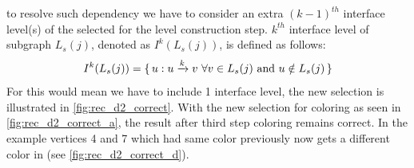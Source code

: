    \Inorder to resolve such dependency we have to consider an extra $(k-1)^{th}$ interface level(s) of the selected \subgraph for the level construction step. $k^{th}$ interface level of subgraph $L_s(j)$, denoted as $I^k(L_s(j))$, is defined as follows:
   \begin{equation*}
	   I^k(L_s(j)) = \set{u : u \xrightarrow{k} v \text{  } \forall v \in L_s(j) \text { and } u \notin L_s(j)}
   \end{equation*}
   For \DTWO this would mean we have to include 1 interface level, the new selection is illustrated in \cref{fig:rec_d2_correct}. With the new \subgraph selection for \DTWO coloring as seen in \cref{fig:rec_d2_correct_a}, the result after third step \DK coloring remains correct. In the example vertices 4 and 7 which had same color previously now gets a different color in (see \cref{fig:rec_d2_correct_d}). 
     
